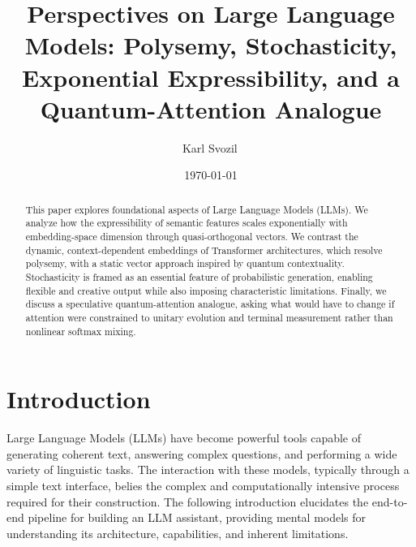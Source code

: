 \documentclass[%
  reprint,
  superscriptaddress,
  showpacs,
  showkeys,
  amsmath,amssymb,
  pra,
  longbibliography,
  floatfix,
  x11names
]{revtex4-2}
\begin{document}
\title{Perspectives on Large Language Models: Polysemy, Stochasticity, Exponential Expressibility, and a Quantum-Attention Analogue}

\author{Karl Svozil\,}

\date{\today}

\begin{abstract}
This paper explores foundational aspects of Large Language Models (LLMs). We analyze how the expressibility of semantic features scales exponentially with embedding-space dimension through quasi-orthogonal vectors. We contrast the dynamic, context-dependent embeddings of Transformer architectures, which resolve polysemy, with a static vector approach inspired by quantum contextuality. Stochasticity is framed as an essential feature of probabilistic generation, enabling flexible and creative output while also imposing characteristic limitations. Finally, we discuss a speculative quantum-attention analogue, asking what would have to change if attention were constrained to unitary evolution and terminal measurement rather than nonlinear softmax mixing.
\end{abstract}


\maketitle

\section{Introduction}

Large Language Models (LLMs) have become powerful tools capable of generating coherent text, answering complex questions, and performing a wide variety of linguistic tasks. The interaction with these models, typically through a simple text interface, belies the complex and computationally intensive process required for their construction.
The following introduction elucidates the end-to-end pipeline for building an LLM assistant, providing mental models for understanding its architecture, capabilities, and inherent limitations.
\end{document}
